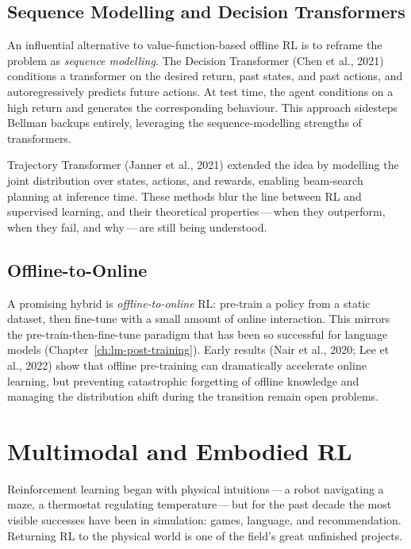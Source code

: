 \subsection{Sequence Modelling and Decision Transformers}

An influential alternative to value-function-based offline RL is to
reframe the problem as \emph{sequence modelling}.  The Decision
Transformer (Chen et al., 2021) conditions a transformer on the
desired return, past states, and past actions, and autoregressively
predicts future actions.  At test time, the agent conditions on a
high return and generates the corresponding behaviour.  This approach
sidesteps Bellman backups entirely, leveraging the sequence-modelling
strengths of transformers.

Trajectory Transformer (Janner et al., 2021) extended the idea by
modelling the joint distribution over states, actions, and rewards,
enabling beam-search planning at inference time.  These methods blur
the line between RL and supervised learning, and their theoretical
properties\,---\,when they outperform, when they fail, and why\,---\,are
still being understood.

\subsection{Offline-to-Online}

A promising hybrid is \emph{offline-to-online} RL: pre-train a policy
from a static dataset, then fine-tune with a small amount of online
interaction.  This mirrors the pre-train-then-fine-tune paradigm that
has been so successful for language models
(Chapter~\ref{ch:lm-post-training}).  Early results (Nair et al.,
2020; Lee et al., 2022) show that offline pre-training can
dramatically accelerate online learning, but preventing catastrophic
forgetting of offline knowledge and managing the distribution shift
during the transition remain open problems.


\section{Multimodal and Embodied RL}
\label{sec:open-embodied}

Reinforcement learning began with physical intuitions\,---\,a robot
navigating a maze, a thermostat regulating temperature\,---\,but for
the past decade the most visible successes have been in simulation:
games, language, and recommendation.  Returning RL to the physical
world is one of the field's great unfinished projects.

